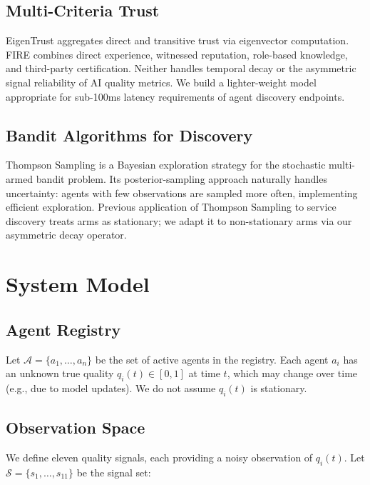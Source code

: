 \documentclass[conference]{IEEEtran}
\begin{document}
\subsection{Multi-Criteria Trust}

EigenTrust \cite{kamvar2003eigentrust} aggregates direct and
transitive trust via eigenvector computation. FIRE
\cite{sabater2005review} combines direct experience,
witnessed reputation, role-based knowledge, and third-party
certification. Neither handles temporal decay or the
asymmetric signal reliability of AI quality metrics. We
build a lighter-weight model appropriate for sub-100ms
latency requirements of agent discovery endpoints.

\subsection{Bandit Algorithms for Discovery}

Thompson Sampling \cite{thompson1933likelihood,russo2018tutorial}
is a Bayesian exploration strategy for the stochastic
multi-armed bandit problem. Its posterior-sampling approach
naturally handles uncertainty: agents with few observations
are sampled more often, implementing efficient exploration.
Previous application of Thompson Sampling to service
discovery \cite{song2012survey} treats arms as stationary;
we adapt it to non-stationary arms via our asymmetric decay
operator.

\section{System Model}
\label{sec:model}

\subsection{Agent Registry}

Let $\mathcal{A} = \{a_1, \ldots, a_n\}$ be the set of
active agents in the registry. Each agent $a_i$ has an
unknown true quality $q_i(t) \in [0,1]$ at time $t$, which
may change over time (e.g., due to model updates). We do not
assume $q_i(t)$ is stationary.

\subsection{Observation Space}

We define eleven quality signals, each providing a noisy
observation of $q_i(t)$. Let
$\mathcal{S} = \{s_1, \ldots, s_{11}\}$ be the signal set:
\end{document}
